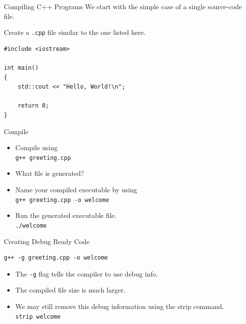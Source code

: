 \documentclass[14pt,aspectratio=1610]{beamer}
\begin{document}
\begin{frame}[fragile]{Compiling C++ Programs}
We start with the simple case of a single source-code file.

Create a \texttt{.cpp} file similar to the one listed here.

\begin{lstlisting}
#include <iostream>

int main()
{
    std::cout << "Hello, World!\n";

    return 0;
}
\end{lstlisting}
\end{frame}

\begin{frame}{Compile}
\begin{itemize}
\item Compile using\\
  \lstinline[language={}, basicstyle=\ttfamily\color{codeVariable}]{g++ greeting.cpp}
\item What file is generated?
\item Name your compiled executable by using\\
  \lstinline[language={}, basicstyle=\ttfamily\color{codeVariable}]{g++ greeting.cpp -o welcome}
\item Run the generated executable file.\\
\lstinline[language={}, basicstyle=\ttfamily\color{codeVariable}]{./welcome}
\end{itemize}
\end{frame}

\begin{frame}[fragile]{Creating Debug Ready Code}
\begin{lstlisting}[language={}, basicstyle=\ttfamily\color{codeVariable}]
g++ -g greeting.cpp -o welcome
\end{lstlisting}

\begin{itemize}
\item The \lstinline[language={}, basicstyle=\ttfamily\color{codeVariable}]{-g} flag tells the compiler to use debug info.
\item The compiled file size is much larger.
\item We may still remove this debug information using the strip command.\\
\lstinline[language={}, basicstyle=\ttfamily\color{codeVariable}]{strip welcome}
\end{itemize}
\end{frame}
\end{document}
